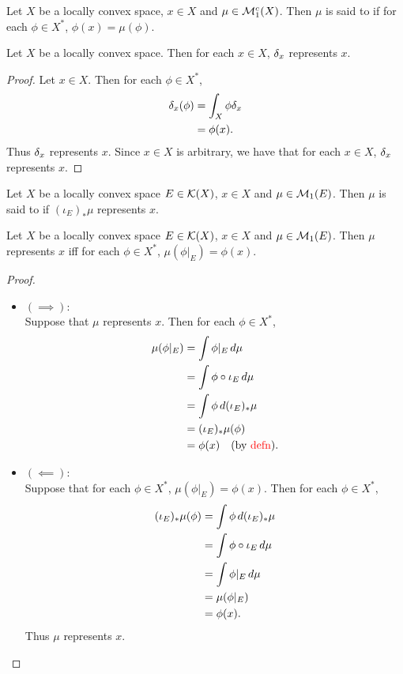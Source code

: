 \documentclass{book}
\begin{document}
	\begin{defn}
		Let $X$ be a locally convex space, $x \in X$ and $\mu \in \mathcal{M}_1^c(X)$. Then $\mu$ is said to  if for each $\phi \in X^*$, $\phi(x) = \mu(\phi)$.  
	\end{defn}
	
	\begin{ex}
		Let $X$ be a locally convex space. Then for each $x \in X$, $\delta_x$ represents $x$. 
	\end{ex}
	
	\begin{proof}
		Let $x \in X$. Then for each $\phi \in X^*$, 
		\begin{align*}
			\delta_x(\phi)
			& = \int_X \phi \delta_x \\
			& = \phi(x).
		\end{align*}
		Thus $\delta_x$ represents $x$. Since $x \in X$ is arbitrary, we have that for each $x \in X$, $\delta_x$ represents $x$. 
	\end{proof}
	
	\begin{defn} 
		Let $X$ be a locally convex space $E \in \mathcal{K}(X)$, $x \in X$ and $\mu \in \mathcal{M}_1(E)$. Then $\mu$ is said to  if $(\iota_E)_*\mu$ represents $x$. 
	\end{defn}
	
	\begin{ex}
		Let $X$ be a locally convex space $E \in \mathcal{K}(X)$, $x \in X$ and $\mu \in \mathcal{M}_1(E)$. Then $\mu$ represents $x$ iff for each $\phi \in X^*$, $\mu(\phi|_E) = \phi(x)$.
	\end{ex}
	
	\begin{proof}\
		\begin{itemize}
			\item $(\implies)$: \\
			Suppose that $\mu$ represents $x$. Then for each $\phi \in X^*$,
			\begin{align*}
				\mu(\phi|_E)
				& = \int \phi|_E \, d \mu \\
				& = \int \phi \circ \iota_E \, d \mu \\
				& = \int \phi \, d (\iota_E)_*\mu \\
				& = (\iota_E)_*\mu(\phi) \\
				& = \phi(x) \quad \text{(by \textcolor{red}{defn})}.
			\end{align*}
			\item $(\impliedby)$: \\
			Suppose that for each $\phi \in X^*$, $\mu(\phi|_E) = \phi(x)$. Then for each $\phi \in X^*$, 
			\begin{align*}
				(\iota_E)_*\mu(\phi)
				& = \int \phi \, d (\iota_E)_*\mu \\
				& = \int \phi \circ \iota_E \, d \mu \\
				& = \int \phi|_E \, d \mu \\
				& = \mu(\phi|_E) \\
				& = \phi(x). 
			\end{align*}
			Thus $\mu$ represents $x$. 
		\end{itemize}
	\end{proof}
	
\end{document}

